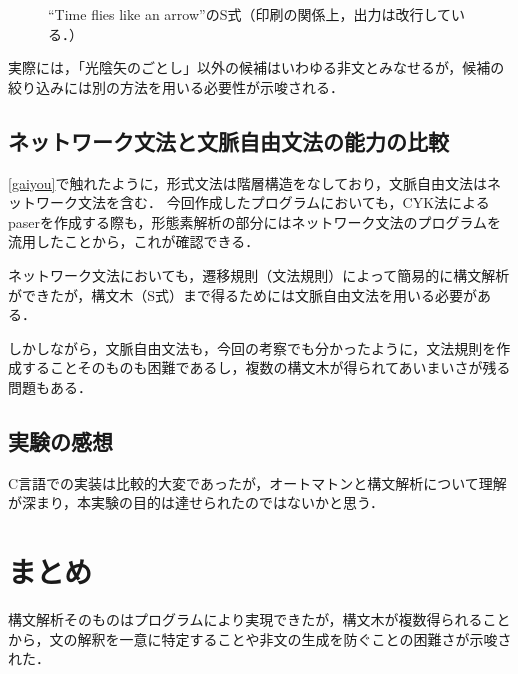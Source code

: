 \documentclass[uplatex, dvipdfmx, a4paper, twocolumn]{jsarticle}
\begin{document}
    \begin{figure}[htpb]
      \centering
      \caption{``Time flies like an arrow''のS式（印刷の関係上，出力は改行している．）}
      \label{fig:result_flies}
    \end{figure}

    実際には，「光陰矢のごとし」以外の候補はいわゆる非文とみなせるが，候補の絞り込みには別の方法を用いる必要性が示唆される．

    \subsection{ネットワーク文法と文脈自由文法の能力の比較}
    \autoref{gaiyou}で触れたように，形式文法は階層構造をなしており，文脈自由文法はネットワーク文法を含む．
    今回作成したプログラムにおいても，CYK法によるpaserを作成する際も，形態素解析の部分にはネットワーク文法のプログラムを流用したことから，これが確認できる．

    ネットワーク文法においても，遷移規則（文法規則）によって簡易的に構文解析ができたが，構文木（S式）まで得るためには文脈自由文法を用いる必要がある．

    しかしながら，文脈自由文法も，今回の考察でも分かったように，文法規則を作成することそのものも困難であるし，複数の構文木が得られてあいまいさが残る問題もある．

    \subsection{実験の感想}
    C言語での実装は比較的大変であったが，オートマトンと構文解析について理解が深まり，本実験の目的は達せられたのではないかと思う．

  \section{まとめ}\label{matome}
  構文解析そのものはプログラムにより実現できたが，構文木が複数得られることから，文の解釈を一意に特定することや非文の生成を防ぐことの困難さが示唆された．

  
  \flushcolsend

  \onecolumn
  \appendix
  \clearpage
\end{document}
